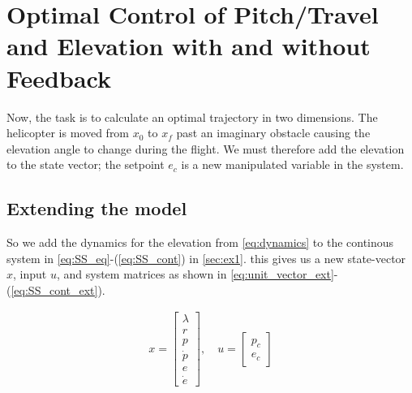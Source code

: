 \section{Optimal Control of Pitch/Travel and Elevation with
and without Feedback}\label{sec:ex4}
Now, the task is to calculate an optimal trajectory in two dimensions. The
helicopter is moved from $x_0$ to $x_f$ past an imaginary obstacle causing the elevation angle to change during the flight. We must therefore add the elevation to the state vector; the setpoint $e_c$ is a new manipulated variable in the system.

\subsection{Extending the model}\label{sec:ex4.1}

So we add the dynamics for the elevation from \cref{eq:dynamics} to the continous system in \cref{eq:SS_eq}-(\ref{eq:SS_cont}) in \cref{sec:ex1}.
this gives us a new state-vector $x$, input $u$, and system matrices as shown in \cref{eq:unit_vector_ext}-(\ref{eq:SS_cont_ext}).

\begin{equation}\label{eq:unit_vector_ext}
    \begin{aligned}
        x =
        \begin{bmatrix} \lambda \\ r \\ p \\ \dot{p} \\ e \\ \dot{e}\end{bmatrix},
        \quad
        u = 
        \begin{bmatrix} p_c \\ e_c\end{bmatrix}
    \end{aligned}
\end{equation}

